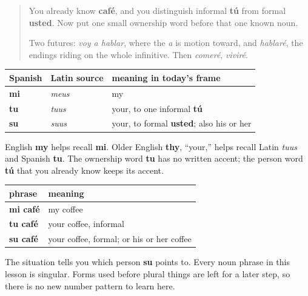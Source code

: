 \label{lesson:ES-C10-mi-tu-su}



\begin{quote}
You already know \textbf{café}, and you distinguish informal \textbf{tú} from formal \textbf{usted}. Now put one small ownership word before that one known noun.

Two futures: \emph{voy a hablar}, where the \emph{a} is motion toward, and \emph{hablaré}, the endings riding on the whole infinitive. Then \emph{comeré}, \emph{viviré}.
\end{quote}

\begin{cousinweb}
\noindent
\begin{tabularx}{\linewidth}{@{}>{\raggedright\arraybackslash}X>{\raggedright\arraybackslash}X>{\raggedright\arraybackslash}X@{}}
\toprule
\textbf{Spanish} & \textbf{Latin source} & \textbf{meaning in today's frame} \\
\midrule
\textbf{mi} & \emph{meus} & my \\
\textbf{tu} & \emph{tuus} & your, to one informal \textbf{tú} \\
\textbf{su} & \emph{suus} & your, to formal \textbf{usted}; also his or her \\
\bottomrule
\end{tabularx}

English \textbf{my} helps recall \textbf{mi}. Older English \textbf{thy}, “your,” helps recall Latin \emph{tuus} and Spanish \textbf{tu}. The ownership word \textbf{tu} has no written accent; the person word \textbf{tú} that you already know keeps its accent.
\end{cousinweb}

\begin{grammarlens}[title={Grammar Lens: put the ownership word before the noun}]
\noindent
\begin{tabularx}{\linewidth}{@{}>{\raggedright\arraybackslash}X>{\raggedright\arraybackslash}X@{}}
\toprule
\textbf{phrase} & \textbf{meaning} \\
\midrule
\textbf{mi café} & my coffee \\
\textbf{tu café} & your coffee, informal \\
\textbf{su café} & your coffee, formal; or his or her coffee \\
\bottomrule
\end{tabularx}

The situation tells you which person \textbf{su} points to. Every noun phrase in this lesson is singular. Forms used before plural things are left for a later step, so there is no new number pattern to learn here.
\end{grammarlens}

